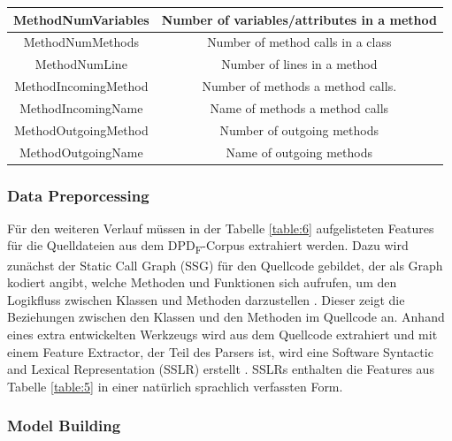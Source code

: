 \documentclass[conference]{IEEEtran}
\begin{document}
\begin{table}
\begin{tabular}{|c|c|}
        \hline
        MethodNumVariables   & Number of variables/attributes in a method                                           \\
        \hline
        MethodNumMethods     & Number of method calls in a class                                                    \\
        \hline
        MethodNumLine        & Number of lines in a method                                                          \\
        \hline
        MethodIncomingMethod & Number of methods a method calls.                                                    \\
        \hline
        MethodIncomingName   & Name of methods a method calls                                                       \\
        \hline
        MethodOutgoingMethod & Number of outgoing methods                                                           \\
        \hline
        MethodOutgoingName   & Name of outgoing methods                                                             \\
        \hline
    \end{tabular}
\end{table}

\newpage

\subsubsection*{Data Preporcessing}

Für den weiteren Verlauf müssen in der Tabelle \ref{table:6} aufgelisteten Features für die Quelldateien aus dem DPD\textsubscript{F}-Corpus extrahiert werden.
Dazu wird zunächst der Static Call Graph (SSG) für den Quellcode gebildet, der als Graph kodiert angibt, welche Methoden und Funktionen sich aufrufen, um den Logikfluss zwischen Klassen und Methoden darzustellen \cite[p. 6]{NAZAR2022111179}.
Dieser zeigt die Beziehungen zwischen den Klassen und den Methoden im Quellcode an. Anhand eines extra entwickelten Werkzeugs wird aus dem Quellcode extrahiert und mit einem Feature Extractor, der Teil des Parsers ist, wird eine Software Syntactic and Lexical Representation (SSLR) erstellt \cite[p. 6]{NAZAR2022111179}.
SSLRs enthalten die Features aus Tabelle \ref{table:5} in einer natürlich sprachlich verfassten Form.

\subsubsection*{Model Building}
\end{document}
